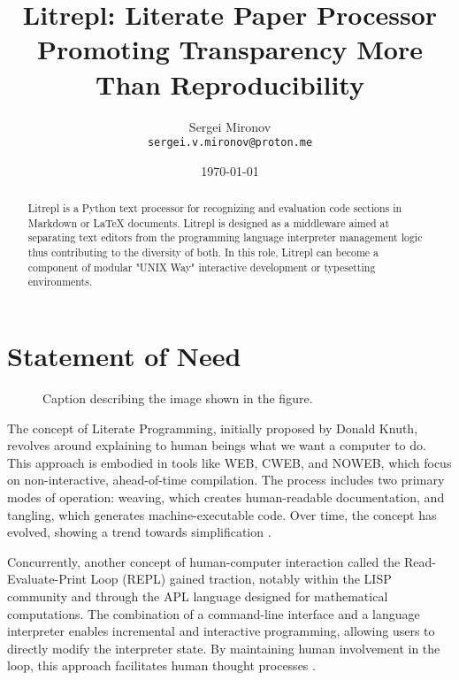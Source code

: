 \documentclass[a4paper,12pt,twocolumn]{article}
\title{Litrepl: Literate Paper Processor Promoting Transparency More Than Reproducibility}
\author{Sergei Mironov \\
        \texttt{sergei.v.mironov@proton.me}}
\date{\today}
\begin{document}
\maketitle

\begin{abstract}
Litrepl is a Python text processor for recognizing and evaluation code sections
in Markdown or LaTeX documents. Litrepl is designed as a middleware aimed at
separating text editors from the programming language interpreter management
logic thus contributing to the diversity of both. In this role, Litrepl can
become a component of modular "UNIX Way" interactive development or typesetting
environments.
\end{abstract}

\section{Statement of Need}

\begin{figure*}[!hbt]
  \centering
  
  \caption{Caption describing the image shown in the figure.}
  \label{fig:resource-allocation}
\end{figure*}

The concept of Literate Programming, initially proposed by Donald Knuth,
revolves around explaining to human beings what we want a computer to do. This
approach is embodied in tools like WEB, CWEB, and NOWEB, which focus on
non-interactive, ahead-of-time compilation. The process includes two primary
modes of operation: weaving, which creates human-readable documentation, and
tangling, which generates machine-executable code. Over time, the concept has
evolved, showing a trend towards simplification \cite{Knuth1984lp,
Ramsey1994lps}.

Concurrently, another concept of human-computer interaction called the
Read-Evaluate-Print Loop (REPL) gained traction, notably within the LISP
community and through the APL language designed for mathematical computations.
The combination of a command-line interface and a language interpreter enables
incremental and interactive programming, allowing users to directly modify the
interpreter state. By maintaining human involvement in the loop, this approach
facilitates human thought processes \cite{Spence1975apl, McCarthy1959recfun,
Iverson1962apl}.
\end{document}
